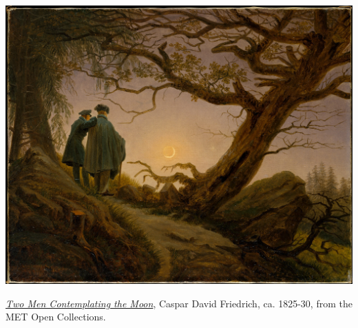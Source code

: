 \begin{plate*}
    \centering
    \includegraphics[width=\textwidth]{00-met-artwork/friedrich_moon.jpg}
    \caption[Two Men Contemplating the Moon, Caspar David Friedrich]{\href{https://www.metmuseum.org/art/collection/search/438417}{\textit{Two Men Contemplating the Moon}}, Caspar David Friedrich, ca. 1825-30, from the  MET Open Collections.}
\end{plate*}